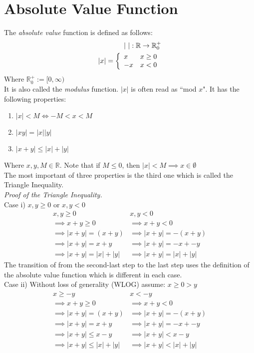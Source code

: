 \section{Absolute Value Function}
The \textit{absolute value} function is defined as follows:
\begin{align*}
    |\text{ }|:\mathbb{R}\to\mathbb{R}_0^+\\
    |x| = \left\{
    \begin{array}{l r}
        x & x \ge 0 \\
        -x & x < 0
    \end{array}\right.
\end{align*}
Where $\mathbb{R}_0^+:=[0, \infty)$ \\
It is also called the \textit{modulus} function. $|x|$ is often read as ``mod $x$".
It has the following properties:
\begin{enumerate}[nosep]
    \item $|x| < M \iff -M < x < M$
    \item $|xy| = |x||y|$
    \item $|x+y| \le |x| + |y|$
\end{enumerate}
Where $x, y, M \in \mathbb{R}$. Note that if $M\le0$, then $|x|<M\implies x\in\emptyset$\\
The most important of three properties is the third one which is called the Triangle Inequality.\\
\textit{Proof of the Triangle Inequality.}\\
Case i) $x, y \ge 0$ or $x, y < 0$
\[\begin{array}{l|l}
    x, y \ge 0 & x, y < 0 \\
    \implies x + y \ge 0 & \implies x + y < 0\\
    \implies |x+y| = (x + y) & \implies |x+y| = -(x+y)\\
    \implies |x+y| = x + y & \implies |x+y| = -x + -y\\
    \implies |x+y| = |x| + |y| & \implies |x+y| = |x| + |y|
\end{array}\]
The transition of from the second-last step to the last step uses the definition of the absolute value function which is different in each case.\\
Case ii) Without loss of generality (WLOG) assume: $x\ge0>y$
\[\begin{array}{l|l}
    x \ge -y & x < -y \\
    \implies x + y \ge 0 & \implies x + y < 0\\
    \implies |x+y| = (x + y) & \implies |x+y| = -(x+y)\\
    \implies |x+y| = x + y & \implies |x+y| = -x + -y\\
    \implies |x+y| \le x - y & \implies |x+y| < x - y\\
    \implies |x+y| \le |x| + |y| & \implies |x+y| < |x| + |y|
\end{array}\]
